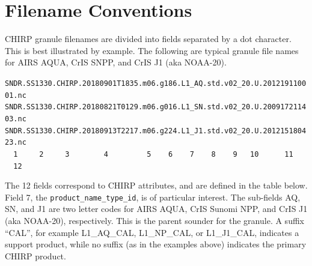 \documentclass[11pt]{article}
\begin{document}
\section{Filename Conventions}

CHIRP granule filenames are divided into fields separated by a dot
character.  This is best illustrated by example.  The following are
typical granule file names for AIRS AQUA, CrIS SNPP, and CrIS J1
(aka NOAA-20).

\begin{center}
\texttt{SNDR.SS1330.CHIRP.20180901T1835.m06.g186.L1\_AQ.std.v02\_20.U.201219110001.nc} \\
\texttt{SNDR.SS1330.CHIRP.20180821T0129.m06.g016.L1\_SN.std.v02\_20.U.200917211403.nc} \\
\texttt{SNDR.SS1330.CHIRP.20180913T2217.m06.g224.L1\_J1.std.v02\_20.U.201215180423.nc} \\
\texttt{~~1~~~~~2~~~~~3~~~~~~~~4~~~~~~~~~5~~~~6~~~~7~~~~8~~~~9~~~10~~~~~~11~~~~~12} \\
\end{center}

The 12 fields correspond to CHIRP attributes, and are defined in the
table below.  Field 7, the \texttt{product\_name\_type\_id}, is of
particular interest.  The sub-fields AQ, SN, and J1 are two letter
codes for AIRS AQUA, CrIS Sunomi NPP, and CrIS J1 (aka NOAA-20),
respectively.  This is the parent sounder for the granule.  A suffix
``CAL'', for example L1\_AQ\_CAL, L1\_NP\_CAL, or L1\_J1\_CAL,
indicates a support product, while no suffix (as in the examples
above) indicates the primary CHIRP product.
\end{document}
